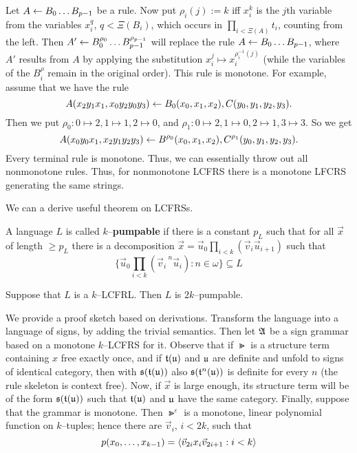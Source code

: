 Let $A \leftarrow B_0 \dotso B_{p-1}$ be a rule. 
Now put $\rho_i(j) := k$ iff $x^k_i$ is the $j$th variable 
from the variables $x_i^q$, $q < \Xi(B_i)$, which occurs in 
$\prod_{i < \Xi(A)} t_i$, counting from the left. Then 
$A' \leftarrow B_0^{\rho_0} \dotso B^{\rho_{p-1}}_{p-1}$ will replace 
the rule $A \leftarrow B_0 \dotso B_{p-1}$, where $A'$ results from 
$A$ by applying the substitution $x_i^j \mapsto x_i^{\rho^{-1}_i(j)}$ 
(while the variables of the $B_i^{\rho}$ remain in the original 
order). This rule is monotone. For example, assume that we have 
the rule
\begin{equation}
A(x_2y_1x_1, x_0y_2y_0y_3) \leftarrow B_0(x_0, x_1, x_2), 
C(y_0, y_1, y_2, y_3).
\end{equation}
Then we put $\rho_0 : 0 \mapsto 2, 1 \mapsto 1, 2 \mapsto 0$, 
and $\rho_1 : 0 \mapsto 2, 1 \mapsto 0, 2 \mapsto 1, 3 \mapsto 3$.
So we get 
\begin{equation}
A(x_0y_0x_1, x_2y_1y_2y_3) \leftarrow B^{\rho_0}(x_0, x_1, x_2), 
C^{\rho_1}(y_0, y_1, y_2, y_3).
\end{equation}
Every terminal rule is monotone. Thus, we can essentially throw 
out all nonmonotone rules. Thus, for nonmonotone LCFRS there is 
a monotone LFCRS generating the same strings. 

We can a derive useful theorem on LCFRSs.
\begin{defn}
A language $L$ is called $k$--\textbf{pumpable} if there is a 
constant $p_L$ such that for all $\vec{x}$ of length $\geq p_L$ 
there is a decomposition 
$\vec{x} = \vec{u}_0\prod_{i < k}({\vec{v}_i}{\vec{u}_{i+1}})$
such that 
\begin{equation}
\{\vec{u}_0\prod_{i < k}({\vec{v}_i\,}^n{\vec{u}_i}) : n \in \omega\} 
\subseteq L
\end{equation}
\end{defn}
\begin{thm}[Groenink]
\label{thm:2kpump}
Suppose that $L$ is a $k$--LCFRL. Then $L$ is $2k$--pumpable.
\end{thm}
We provide a proof sketch based on derivations. Transform the language 
into a language of signs, by adding the trivial semantics. Then 
let $\mathfrak{A}$ be a sign grammar based on a monotone $k$--LCFRS for it.
Observe that if $\Gt$ is a structure term containing $x$ free 
exactly once, and if $\mathfrak{t}(\mathfrak{u})$ and $\mathfrak{u}$ are definite 
and unfold to signs of identical category, then with $\mathfrak{s}(\mathfrak{t}(\mathfrak{u}))$ 
also $\mathfrak{s}(\mathfrak{t}^n(\mathfrak{u}))$ is definite for every $n$ (the rule skeleton 
is context free). Now, if $\vec{x}$ is large enough, its structure 
term will be of the form $\mathfrak{s}(\mathfrak{t}(\mathfrak{u}))$ such that $\mathfrak{t}(\mathfrak{u})$ 
and $\mathfrak{u}$ have the same category. Finally, suppose that the 
grammar is monotone. Then $\Gt^{\varepsilon}$ is a monotone, 
linear polynomial function on $k$--tuples; hence there are 
$\vec{v}_i$, $i < 2k$, such that 
\begin{equation}
p(x_0, \dotsc, x_{k-1}) = \langle \vec{v}_{2i}x_i\vec{v}_{2i+1} : 
i < k\rangle
\end{equation}

